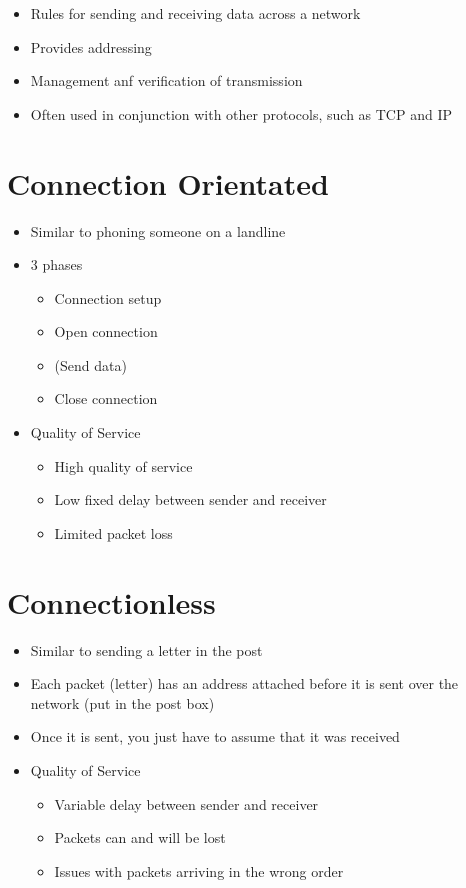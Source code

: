 
\begin{itemize}
  \item Rules for sending and receiving data across a network
  \item Provides addressing
  \item Management anf verification of transmission
  \item Often used in conjunction with other protocols, such as TCP and IP
\end{itemize}

\section*{Connection Orientated}

\begin{itemize}
  \item Similar to phoning someone on a landline
  \item 3 phases
  \begin{itemize}
    \item Connection setup
    \item Open connection
    \item (Send data)
    \item Close connection
  \end{itemize}
  \item Quality of Service
  \begin{itemize}
    \item High quality of service
    \item Low fixed delay between sender and receiver
    \item Limited packet loss
  \end{itemize}
\end{itemize}

\section*{Connectionless}

\begin{itemize}
  \item Similar to sending a letter in the post
  \item Each packet (letter) has an address attached before it is sent over the network (put in the post box)
  \item Once it is sent, you just have to assume that it was received
  \item Quality of Service
  \begin{itemize}
    \item Variable delay between sender and receiver
    \item Packets can and will be lost
    \item Issues with packets arriving in the wrong order
  \end{itemize}
\end{itemize}

